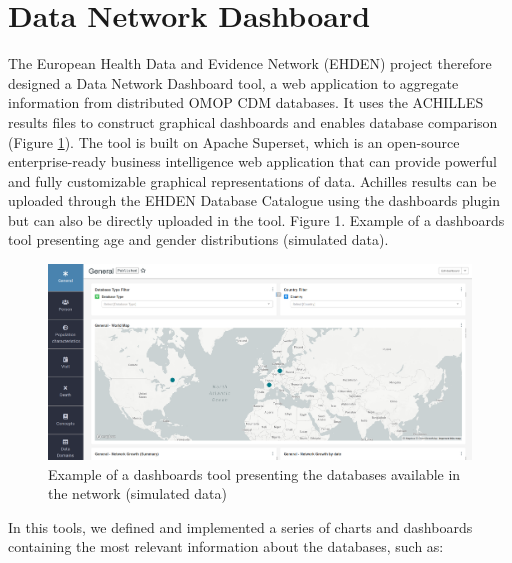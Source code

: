 \documentclass[]{book}
\begin{document}
\section{Data Network Dashboard}\label{data-network-dashboard}

The European Health Data and Evidence Network (EHDEN) project therefore
designed a Data Network Dashboard tool, a web application to aggregate
information from distributed OMOP CDM databases. It uses the ACHILLES
results files to construct graphical dashboards and enables database
comparison (Figure \ref{fig:cdmBI}). The tool is built on Apache
Superset, which is an open-source enterprise-ready business intelligence
web application that can provide powerful and fully customizable
graphical representations of data. Achilles results can be uploaded
through the EHDEN Database Catalogue using the dashboards plugin but can
also be directly uploaded in the tool. Figure 1. Example of a dashboards
tool presenting age and gender distributions (simulated data).

\begin{figure}
\includegraphics[width=1\linewidth]{images/cdmBI} \caption{Example of a dashboards tool presenting the databases available in the network (simulated data)}\label{fig:cdmBI}
\end{figure}

In this tools, we defined and implemented a series of charts and
dashboards containing the most relevant information about the databases,
such as:
\end{document}
